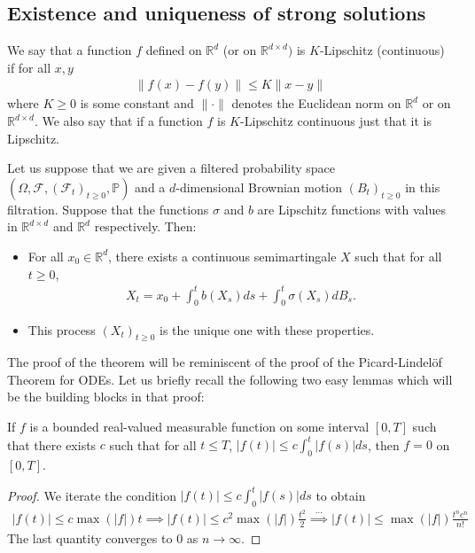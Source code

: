 \documentclass[../mainfile.tex]{subfiles}
\begin{document}
\subsection{Existence and uniqueness of strong solutions}
\begin{defn} We say that a function $f$ defined on $\mathbb{R}^d$ (or on $\mathbb{R}^{d \times d})$ is $K$-Lipschitz (continuous) if for all $x,y$ 
\begin{align*}
\| f(x)-f(y)\| \leq K \|x-y\|
\end{align*}
where $K \geq 0$ is some constant and $\| \cdot \|$ denotes the Euclidean norm on $\mathbb{R}^d$ or on $\mathbb{R}^{d \times d}$. We also say that if a function $f$ is $K$-Lipschitz continuous just that it is Lipschitz.
\end{defn}
\begin{thm} Let us suppose that we are given a filtered probability space $(\Omega, \mathcal{F}, (\mathcal{F}_t)_{t \geq 0}, \mathbb{P})$ and a $d$-dimensional Brownian motion $(B_t)_{t \geq 0}$ in this filtration. Suppose that the functions $\sigma$ and $b$ are Lipschitz functions with values in $\mathbb{R}^{d \times d}$ and $\mathbb{R}^d$ respectively. Then:
\begin{itemize}
\item For all $x_0 \in \mathbb{R}^d$, there exists a continuous semimartingale $X$ such that for all $t \geq 0$, 
\begin{align*}
X_t = x_0 + \int_0^t b(X_s)ds + \int_0^t \sigma(X_s)dB_s.
\end{align*}
\item This process $(X_t)_{t \geq 0}$ is the unique one with these properties. 
\end{itemize}
\end{thm}
The proof of the theorem will be reminiscent of the proof of the Picard-Lindelöf Theorem for ODEs. Let us briefly recall the following two easy lemmas which will be the building blocks in that proof:
\begin{lem} If $f$ is a bounded real-valued measurable function on some interval $[0,T]$ such that there exists $c$ such that for all $t \leq T$, $|f(t)| \leq c \int_0^t|f(s)|ds$, then $f=0$ on $[0,T]$.
\end{lem}
\begin{proof} We iterate the condition $|f(t)| \leq c \int_0^t |f(s)|ds$ to obtain
\begin{align*}
|f(t)| \leq c \max (|f|) t \implies |f(t)| \leq c^2 \max (|f|) \frac{t^2}{2} \overset{\dots}\implies |f(t)| \leq \max(|f|) \frac{t^nc^n	}{n!}
\end{align*}
The last quantity converges to $0$ as $n \to \infty$. 
\end{proof}
\end{document}
